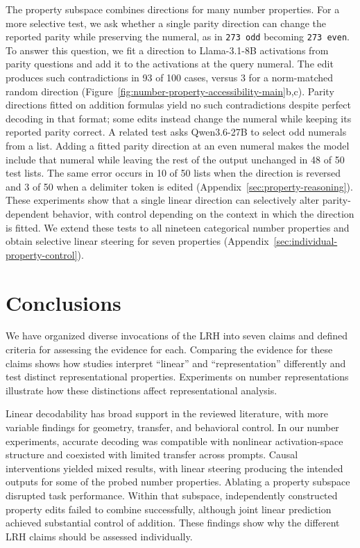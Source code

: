 \documentclass[11pt]{article}
\begin{document}
The property subspace combines directions for many number properties.
For a more selective test, we ask whether a single parity direction can change the reported parity while preserving the numeral, as in \texttt{273 odd} becoming \texttt{273 even}.
To answer this question, we fit a direction to Llama-3.1-8B activations from parity questions and add it to the activations at the query numeral.
The edit produces such contradictions in 93 of 100 cases, versus 3 for a norm-matched random direction (Figure~\ref{fig:number-property-accessibility-main}b,c).
Parity directions fitted on addition formulas yield no such contradictions despite perfect decoding in that format; some edits instead change the numeral while keeping its reported parity correct.
A related test asks Qwen3.6-27B to select odd numerals from a list.
Adding a fitted parity direction at an even numeral makes the model include that numeral while leaving the rest of the output unchanged in 48 of 50 test lists.
The same error occurs in 10 of 50 lists when the direction is reversed and 3 of 50 when a delimiter token is edited (Appendix~\ref{sec:property-reasoning}).
These experiments show that a single linear direction can selectively alter parity-dependent behavior, with control depending on the context in which the direction is fitted.
We extend these tests to all nineteen categorical number properties and obtain selective linear steering for seven properties (Appendix~\ref{sec:individual-property-control}).

\section{Conclusions}

We have organized diverse invocations of the LRH into seven claims and defined criteria for assessing the evidence for each.
Comparing the evidence for these claims shows how studies interpret ``linear'' and ``representation'' differently and test distinct representational properties.
Experiments on number representations illustrate how these distinctions affect representational analysis.

Linear decodability has broad support in the reviewed literature, with more variable findings for geometry, transfer, and behavioral control.
In our number experiments, accurate decoding was compatible with nonlinear activation-space structure and coexisted with limited transfer across prompts.
Causal interventions yielded mixed results, with linear steering producing the intended outputs for some of the probed number properties.
Ablating a property subspace disrupted task performance.
Within that subspace, independently constructed property edits failed to combine successfully, although joint linear prediction achieved substantial control of addition.
These findings show why the different LRH claims should be assessed individually.
\end{document}
